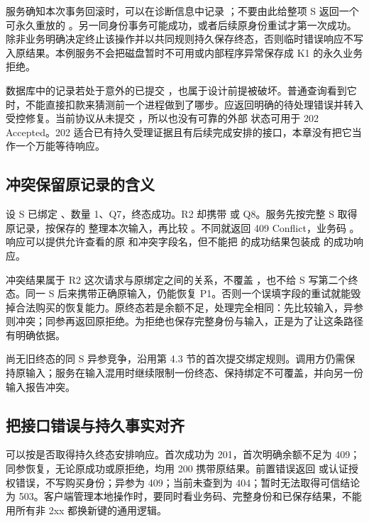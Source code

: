 服务确知本次事务回滚时，可以在诊断信息中记录 ；不要由此给整项 S 返回一个可永久重放的 。另一同身份事务可能成功，或者后续原身份重试才第一次成功。除非业务明确决定终止该操作并以共同规则持久保存终态，否则临时错误响应不写入原结果。本例服务不会把磁盘暂时不可用或内部程序异常保存成 K1 的永久业务拒绝。

数据库中的记录若处于意外的已提交 ，也属于设计前提被破坏。普通查询看到它时，不能直接扣款来猜测前一个进程做到了哪步。应返回明确的待处理错误并转入受控修复。当前协议从未提交 ，所以也没有可靠的外部  状态可用于 202 Accepted。202 适合已有持久受理证据且有后续完成安排的接口，本章没有把它当作一个万能等待响应。

\subsection*{冲突保留原记录的含义}

设 S 已绑定 、数量 1、Q7，终态成功。R2 却携带  或 Q8。服务先按完整 S 取得原记录，按保存的  整理本次输入，再比较 。不同就返回 409 Conflict，业务码 。响应可以提供允许查看的原  和冲突字段名，但不能把  的成功结果包装成  的成功响应。

冲突结果属于 R2 这次请求与原绑定之间的关系，不覆盖 ，也不给 S 写第二个终态。同一 S 后来携带正确原输入，仍能恢复 P1。否则一个误填字段的重试就能毁掉合法购买的恢复能力。原终态若是余额不足，处理完全相同：先比较输入，异参则冲突；同参再返回原拒绝。为拒绝也保存完整身份与输入，正是为了让这条路径有明确依据。

尚无旧终态的同 S 异参竞争，沿用第 4.3 节的首次提交绑定规则。调用方仍需保持原输入；服务在输入混用时继续限制一份终态、保持绑定不可覆盖，并向另一份输入报告冲突。

\subsection*{把接口错误与持久事实对齐}

可以按是否取得持久终态安排响应。首次成功为 201，首次明确余额不足为 409；同参恢复，无论原成功或原拒绝，均用 200 携带原结果。前置错误返回  或认证授权错误，不写购买身份；异参为 409；当前未查到为 404；暂时无法取得可信结论为 503。客户端管理本地操作时，要同时看业务码、完整身份和已保存结果，不能用所有非 2xx 都换新键的通用逻辑。

